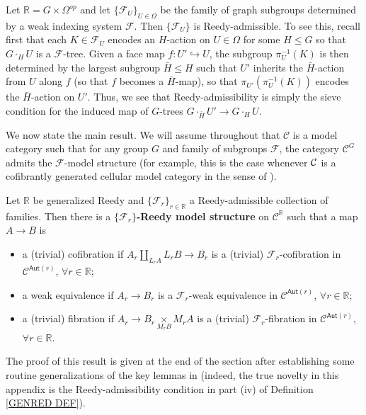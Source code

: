\documentclass[a4paper,10pt,draft]{article}%
\numberwithin{equation}{section}%
\numberwithin{figure}{section}
\begin{document}
\begin{example}
	Let $\mathbb{R} = G \times \Omega^{op}$ and let
	$\{\mathcal{F}_U\}_{U \in \Omega}$ be the family of graph subgroups determined by a weak indexing system $\mathcal{F}$.
	Then $\{\mathcal{F}_U\}$ is Reedy-admissible.
	To see this, recall first that each $K \in \mathcal{F}_U$ encodes 
	an $H$-action on $U \in \Omega$ for some $H \leq G$
	so that $G \cdot_H U$ is a $\mathcal{F}$-tree.
	Given a face map $f \colon U' \hookrightarrow U$, 
	the subgroup $\pi^{-1}_U(K)$ is then determined by the largest subgroup $\bar{H}\leq H$ such that 
	$U'$ inherits the $\bar{H}$-action from $U$ along $f$ (so that $f$ becomes a $\bar{H}$-map), 
	so that $\pi_{U'}(\pi^{-1}_U(K))$ encodes the $\bar{H}$-action on $U'$. Thus, we see that Reedy-admissibility is simply the sieve condition for the induced map of $G$-trees
	$G \cdot_{\bar{H}} U' \to G \cdot_H U$.
\end{example}

We now state the main result.
We will assume throughout that $\mathcal{C}$ is a model category such that for any group $G$ and family of subgroups $\mathcal{F}$,
the category $\mathcal{C}^G$ admits the
$\mathcal{F}$-model structure
(for example, this is the case whenever $\mathcal{C}$ is a cofibrantly generated cellular model category in the sense of \cite{Ste16}).


\begin{theorem}\label{REEDYADM THM}
Let $\mathbb{R}$ be generalized Reedy and 
$\{\mathcal{F}_r\}_{r \in \mathbb{R}}$ a Reedy-admissible collection of families. 
Then there is a \textbf{$\{\mathcal{F}_r\}$-Reedy model structure} on
$\mathcal{C}^{\mathbb{R}}$ such that a map $A \to B$ is
\begin{itemize}
  \item a (trivial) cofibration if $A_r \underset{L_r A}{\coprod}L_r B \to B_r$ is a (trivial) $\mathcal{F}_r$-cofibration in $\mathcal{C}^{\mathsf{Aut}(r)}$, $\forall r \in \mathbb{R}$;
	\item a weak equivalence if $A_r \to B_r$ is a $\mathcal{F}_r$-weak equivalence in $\mathcal{C}^{\mathsf{Aut}(r)}$, $\forall r \in \mathbb{R}$;
	\item a (trivial) fibration if $A_r \to B_r \underset{M_r B}{\times }M_r A $ is a (trivial) $\mathcal{F}_r$-fibration in $\mathcal{C}^{\mathsf{Aut}(r)}$, $\forall r \in \mathbb{R}$.
\end{itemize}
\end{theorem}

The proof of this result is given at the end of the section after establishing some routine generalizations of the key lemmas in \cite{BM11}
(indeed, the true novelty in this appendix is the Reedy-admissibility condition in part (iv) of Definition \ref{GENRED DEF}).
\end{document}
